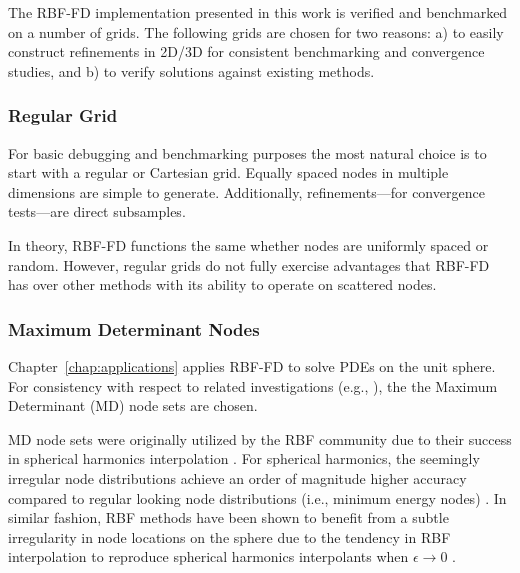 \documentclass[11pt]{report}
\begin{document}
{%

The RBF-FD implementation presented in this work is verified and benchmarked on a number of grids. The following grids are chosen for two reasons: a) to easily construct refinements in 2D/3D for consistent benchmarking and convergence studies, and b) to verify solutions against existing methods. 


\subsubsection{Regular Grid}
For basic debugging and benchmarking purposes the most natural choice is to start with a regular or Cartesian grid. Equally spaced nodes in multiple dimensions are simple to generate. Additionally, refinements---for convergence tests---are direct subsamples. 

In theory, RBF-FD functions the same whether nodes are uniformly spaced or random. However, regular grids do not fully exercise advantages that RBF-FD has over other methods with its ability to operate on scattered nodes.


\subsubsection{Maximum Determinant Nodes}

Chapter~\ref{chap:applications} applies RBF-FD to solve PDEs on the unit sphere. For consistency with respect to related investigations (e.g., \cite{Fornberg2009a, Fornberg2007,FornbergLehto11}), the the Maximum Determinant (MD) node sets \cite{Womersley2001, Sloan2003} are chosen. 

MD node sets were originally utilized by the RBF community due to their success in spherical harmonics interpolation \cite{Fornberg2007}. For spherical harmonics, the seemingly irregular node distributions achieve an order of magnitude higher accuracy compared to regular looking node distributions (i.e., minimum energy nodes) \cite{Womersley2001}. In similar fashion, RBF methods have been shown to benefit from a subtle irregularity in node locations on the sphere due to the tendency in RBF interpolation to reproduce spherical harmonics interpolants when $\epsilon \rightarrow 0$ \cite{Fornberg2007}. 

}
\end{document}

